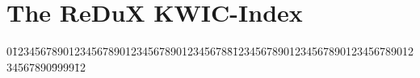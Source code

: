 \section{The ReDuX KWIC-Index}

{\small
\begin{tabbing}
0\=12345678901234567890123456789012345678\=8\=1234567890123456789012345678901234567890\=9999\=12\kill



\end{tabbing}
}

